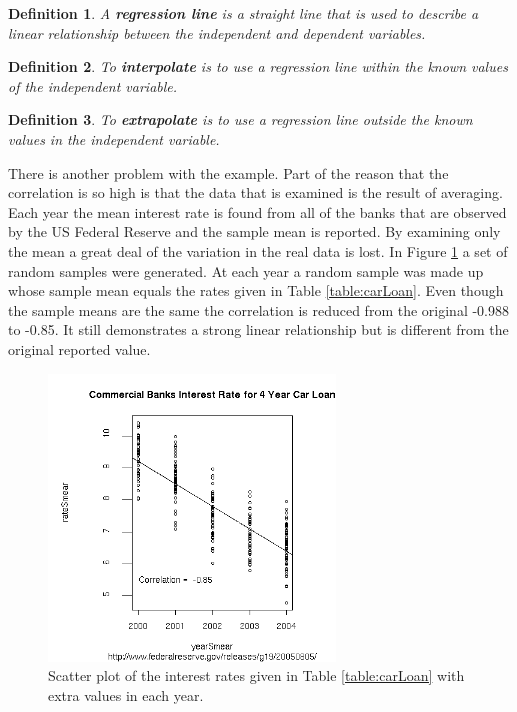 \documentclass[12pt]{article}
\newtheorem{definition}{Definition}[section]
\begin{document}
\begin{definition}
  A \textbf{regression line} is a straight line that is used to
  describe a linear relationship between the independent and dependent
  variables.
\end{definition}
  
\begin{definition}
  To \textbf{interpolate} is to use a regression line within the known
  values of the independent variable.
\end{definition}

\begin{definition}
  To \textbf{extrapolate} is to use a regression line outside the
  known values in the independent variable.
\end{definition}

There is another problem with the example. Part of the reason that the
correlation is so high is that the data that is examined is the result
of averaging. Each year the mean interest rate is found from all of
the banks that are observed by the US Federal Reserve and the sample
mean is reported. By examining only the mean a great deal of the
variation in the real data is lost. In Figure \ref{fig:carLoanSmear} a
set of random samples were generated. At each year a random sample was
made up whose sample mean equals the rates given in Table
\ref{table:carLoan}. Even though the sample means are the same the
correlation is reduced from the original -0.988 to -0.85. It still
demonstrates a strong linear relationship but is different from the
original reported value.

\begin{figure}[tb]
  \centerline{\includegraphics[height=3in]{bankRatesSmear}}
  \caption{Scatter plot of the interest rates given in Table
    \ref{table:carLoan} with extra values in each year.}
  \label{fig:carLoanSmear}
\end{figure}
\end{document}
